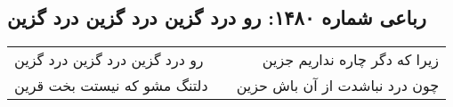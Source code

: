 \begin{center}
\section*{رباعی شماره ۱۴۸۰: رو درد گزین درد گزین درد گزین}
\label{sec:1480}
\begin{longtable}{l p{0.5cm} r}
رو درد گزین درد گزین درد گزین
&&
زیرا که دگر چاره نداریم جزین
\\
دلتنگ مشو که نیستت بخت قرین
&&
چون درد نباشدت از آن باش حزین
\\
\end{longtable}
\end{center}
